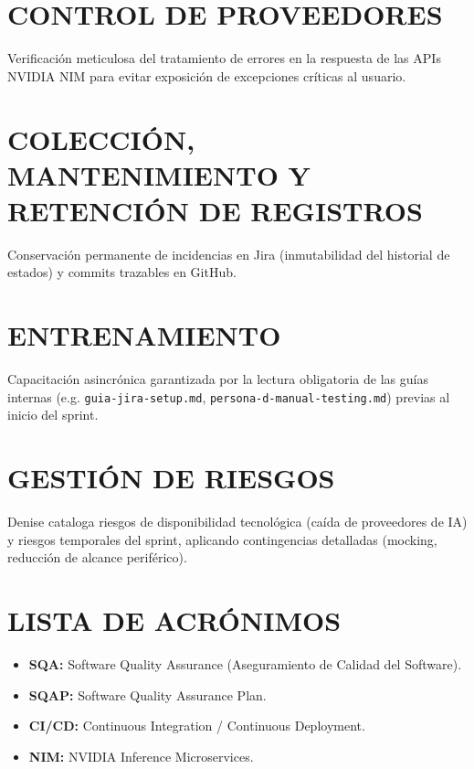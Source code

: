 \documentclass[12pt,a4paper]{article}
\begin{document}
\section{CONTROL DE PROVEEDORES}
Verificación meticulosa del tratamiento de errores en la respuesta de las APIs NVIDIA NIM para evitar exposición de excepciones críticas al usuario.

\section{COLECCIÓN, MANTENIMIENTO Y RETENCIÓN DE REGISTROS}
Conservación permanente de incidencias en Jira (inmutabilidad del historial de estados) y commits trazables en GitHub.

\section{ENTRENAMIENTO}
Capacitación asincrónica garantizada por la lectura obligatoria de las guías internas (e.g. \texttt{guia-jira-setup.md}, \texttt{persona-d-manual-testing.md}) previas al inicio del sprint.

\section{GESTIÓN DE RIESGOS}
Denise cataloga riesgos de disponibilidad tecnológica (caída de proveedores de IA) y riesgos temporales del sprint, aplicando contingencias detalladas (mocking, reducción de alcance periférico).

\appendix
\section{LISTA DE ACRÓNIMOS}
\begin{itemize}
    \item \textbf{SQA:} Software Quality Assurance (Aseguramiento de Calidad del Software).
    \item \textbf{SQAP:} Software Quality Assurance Plan.
    \item \textbf{CI/CD:} Continuous Integration / Continuous Deployment.
    \item \textbf{NIM:} NVIDIA Inference Microservices.
\end{itemize}
\end{document}
